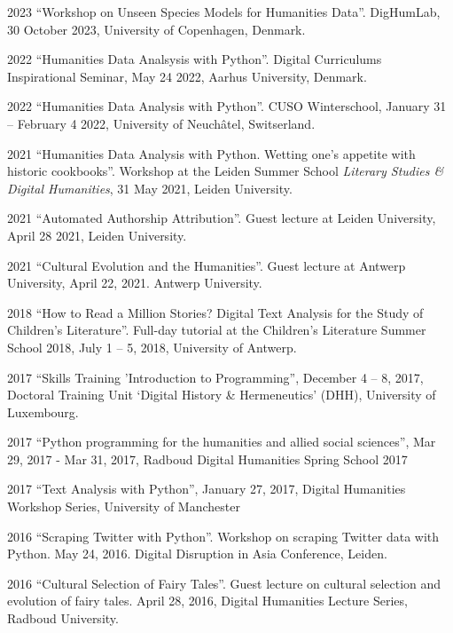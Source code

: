 \documentclass[12pt,letterpaper]{report}
\begin{document}
\begin{tablist}
  \item[2023] \tab{}``Workshop on Unseen Species Models for Humanities Data''.
    DigHumLab, 30 October 2023, University of Copenhagen, Denmark. 
  \item[2022] \tab{}``Humanities Data Analsysis with Python''. Digital Curriculums
    Inspirational Seminar, May 24 2022, Aarhus University, Denmark.
  \item[2022] \tab{}``Humanities Data Analysis with Python''. CUSO Winterschool, January 31 
    -- February 4 2022, University of Neuchâtel, Switserland. 
  \item[2021] \tab{}``Humanities Data Analysis with Python. Wetting one’s appetite with
    historic cookbooks''. Workshop at the Leiden Summer School \textit{Literary Studies \&
      Digital Humanities}, 31 May 2021, Leiden University.
  \item[2021] \tab{}``Automated Authorship Attribution''. Guest lecture at Leiden
    University, April 28 2021, Leiden University.     
  \item[2021] \tab{}``Cultural Evolution and the Humanities''. Guest lecture at Antwerp
    University, April 22, 2021. Antwerp University. 
  \item[2018] \tab{}``How to Read a Million Stories? Digital Text Analysis for the Study of
    Children's Literature''. Full-day tutorial at the Children’s Literature Summer School
    2018, July 1 -- 5, 2018, University of Antwerp.  
  \item[2017] \tab{}``Skills Training ’Introduction to Programming'', December 4 -- 8,
    2017, Doctoral Training Unit `Digital History \& Hermeneutics' (DHH), University of
    Luxembourg. 
  \item[2017] \tab{}``Python programming for the humanities and allied social sciences'',
    Mar 29, 2017 - Mar 31, 2017, Radboud Digital Humanities Spring School 2017
  \item[2017] \tab{}``Text Analysis with Python'', January 27, 2017, Digital Humanities
    Workshop Series, University of Manchester
  \item[2016] \tab{}``Scraping Twitter with Python''. Workshop on scraping Twitter data
    with Python. May 24, 2016. Digital Disruption in Asia Conference, Leiden. 
  \item[2016] \tab{}``Cultural Selection of Fairy Tales''. Guest lecture on cultural
    selection and evolution of fairy tales. April 28, 2016, Digital Humanities Lecture
    Series, Radboud University. 

\end{tablist}
\end{document}
